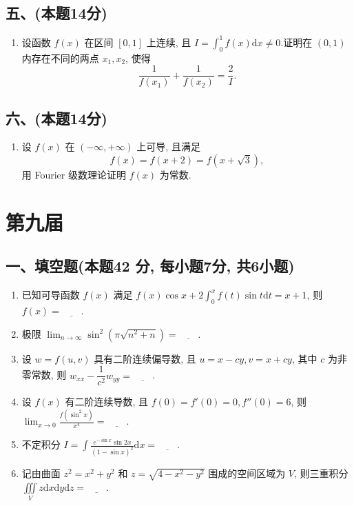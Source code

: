 \subsection*{五、(本题14分)}
\begin{enumerate}[start=9]
    \item 设函数 $f(x)$ 在区间 $[0, 1]$ 上连续,  且 $I = \displaystyle\int_0^1 f(x)  \mathrm{d}x \neq 0$.证明在 $(0, 1)$ 内存在不同的两点 $x_1,  x_2$,  使得
          \[
              \frac{1}{f(x_1)} + \frac{1}{f(x_2)} = \frac{2}{I}.
          \]
\end{enumerate}

\subsection*{六、(本题14分)}
\begin{enumerate}[start=10]
    \item 设 $f(x)$ 在 $(-\infty,  +\infty)$ 上可导,  且满足
          \[
              f(x) = f(x + 2) = f(x + \sqrt{3}),
          \]
          用 Fourier 级数理论证明 $f(x)$ 为常数.
\end{enumerate}


\newpage
\section{第九届}

\subsection*{一、填空题(本题42 分,  每小题7分,  共6小题)}
\begin{enumerate}
    \item 已知可导函数 $f(x)$ 满足 $f(x) \cos x + 2 \displaystyle\int_0^x f(t) \sin t  \mathrm{d}t = x + 1$,  则 $f(x) = \underline{\quad\quad}$.
    \item 极限 $\displaystyle\lim_{n \to \infty} \sin^2 \left( \pi \sqrt{n^2 + n} \right) = \underline{\quad\quad}$.
    \item 设 $w = f(u,  v)$ 具有二阶连续偏导数,  且 $u = x - cy,  v = x + cy$,  其中 $c$ 为非零常数,  则 $w_{xx} - \dfrac{1}{c^2} w_{yy} = \underline{\quad\quad}$.
    \item 设 $f(x)$ 有二阶连续导数,  且 $f(0) = f'(0) = 0,  f''(0) = 6$,  则 $\displaystyle\lim_{x \to 0} \frac{f \left( \sin^2 x \right)}{x^4} = \underline{\quad\quad}$.
    \item 不定积分 $I = \displaystyle\int \frac{e^{-\sin x} \sin 2x}{(1 - \sin x)^2}  \mathrm{d}x = \underline{\quad\quad}$.
    \item 记由曲面 $z^2 = x^2 + y^2$ 和 $z = \sqrt{4 - x^2 - y^2}$ 围成的空间区域为 $V$,  则三重积分 $\displaystyle\iiint\limits_{V} z  \mathrm{d}x  \mathrm{d}y  \mathrm{d}z = \underline{\quad\quad}$.
\end{enumerate}

